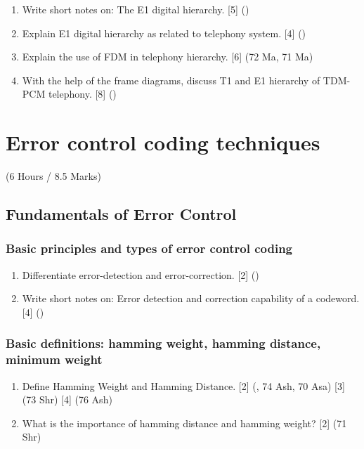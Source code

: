 \documentclass[12pt]{article}
\begin{document}
\begin{enumerate}
        \item Write short notes on: The E1 digital hierarchy. \hfill [5] ()
        
        \item Explain E1 digital hierarchy as related to telephony system. \hfill [4] ()

        \item Explain the use of FDM in telephony hierarchy. \hfill [6] (72 Ma, 71 Ma)
        
        \item With the help of the frame diagrams, discuss T1 and E1 hierarchy of TDM-PCM telephony. \hfill [8] ()
      \end{enumerate}

\pagebreak

\section{Error control coding techniques}
  \begin{center}(6 Hours / 8.5 Marks)\end{center}

  \subsection{Fundamentals of Error Control}
    \subsubsection{Basic principles and types of error control coding}
      \begin{enumerate}
        \item Differentiate error-detection and error-correction. \hfill [2] ()
        
        \item Write short notes on: Error detection and correction capability of a codeword. \hfill [4] ()
      \end{enumerate}

    \subsubsection{Basic definitions: hamming weight, hamming distance, minimum weight}
      \begin{enumerate}
        \item Define Hamming Weight and Hamming Distance. \hfill [2] (, 74 Ash, 70 Asa) [3] (73 Shr) [4] (76 Ash)
        
        \item What is the importance of hamming distance and hamming weight? \hfill [2] (71 Shr)
      \end{enumerate}
\end{document}
